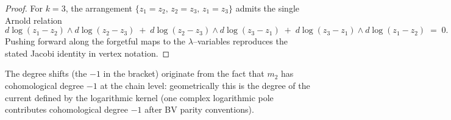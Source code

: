 \begin{proof}
For $k=3$, the arrangement $\{z_1=z_2,\, z_2=z_3,\, z_1=z_3\}$ admits the single Arnold relation
\[
 d\log(z_1-z_2)\wedge d\log(z_2-z_3) \;+\; d\log(z_2-z_3)\wedge d\log(z_3-z_1) \;+\; d\log(z_3-z_1)\wedge d\log(z_1-z_2) \;=\; 0.
\]
Pushing forward along the forgetful maps to the $\lambda$–variables reproduces the stated Jacobi identity in vertex notation.
\end{proof}

\begin{remark}
The degree shifts (the $-1$ in the bracket) originate from the fact that $m_2$ has cohomological degree $-1$ at the chain level: geometrically this is the degree of the current defined by the logarithmic kernel (one complex logarithmic pole contributes cohomological degree $-1$ after BV parity conventions).
\end{remark}
